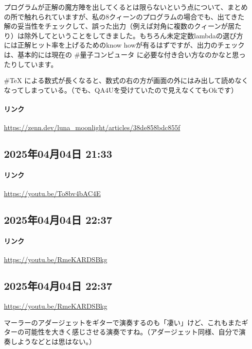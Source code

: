 プログラムが正解の魔方陣を出してくるとは限らないという点について、まとめの所で触れられていますが、私の8クィーンのプログラムの場合でも、出てきた解の妥当性をチェックして、誤った出力（例えば対角に複数のクィーンが居たり）は除外してということをしてきました。もちろん未定定数lambdaの選び方には正解ヒット率を上げるためのknow howが有るはずですが、出力のチェックは、基本的には現在の \#量子コンピュータ に必要な付き合い方なのかなと思ったりしています。

\#TeX による数式が長くなると、数式の右の方が画面の外にはみ出して読めなくなってしまっている。（でも、QA4Uを受けていたので見えなくてもOkです）

\paragraph{リンク}
\url{https://zenn.dev/luna_moonlight/articles/38de858bdc855f}

\subsection*{2025年04月04日 21:33}

\paragraph{リンク}
\url{https://youtu.be/To8bv4bAC4E}

\subsection*{2025年04月04日 22:37}

\paragraph{リンク}
\url{https://youtu.be/RmeKARDSBkg}

\subsection*{2025年04月04日 22:37}

\url{https://youtu.be/RmeKARDSBkg}

マーラーのアダージェットをギターで演奏するのも「凄い」けど、これもまたギターの可能性を大きく感じさせる演奏ですね。（アダージェット同様、自分で演奏しようなどとは思はない。）

